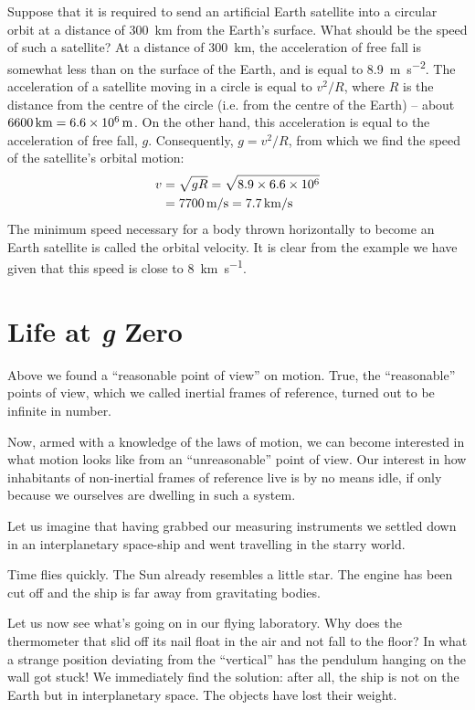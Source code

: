 Suppose that it is required to send an artificial Earth
satellite into a circular orbit at a distance of \SI{300}{\kilo\meter} from the Earth's surface. What should be the speed of such a
satellite? At a distance of \SI{300}{\kilo\meter}, the acceleration of
free fall is somewhat less than on the surface of the Earth,
and is equal to \SI{8.9}{\meter\per\second\squared}. The acceleration of a satellite moving in a circle is equal to $v^{2}/R$, where $R$ is the distance from the centre of the circle (i.e. from the centre of the
Earth) -- about $\SI{6600}{\kilo\meter} = \SI{6.6d6}{\meter}$. On the other hand, this acceleration is equal to the acceleration of free
fall, $g$. Consequently, $g = v^{2}/R$, from which we find
the speed of the satellite's orbital motion:
\begin{align*}
v & = \sqrt{gR} = \sqrt{8.9 \times \num{6.6d6}} \\
& = \SI{7700}{\meter\per\second} = \SI{7.7}{\kilo\meter\per\second}
\end{align*}
The minimum speed necessary for a body thrown horizontally to become an Earth satellite is called the orbital velocity. It is clear from the example we have given that this speed is close to \SI{8}{\kilo\meter\per\second}.


\section{Life at \emph{g} Zero}

Above we found a ``reasonable point of view'' on motion.
True, the ``reasonable'' points of view, which we called
inertial frames of reference, turned out to be infinite in
number.

Now, armed with a knowledge of the laws of motion,
we can become interested in what motion looks like
from an ``unreasonable'' point of view. Our interest in
how inhabitants of non-inertial frames of reference live
is by no means idle, if only because we ourselves are
dwelling in such a system.

Let us imagine that having grabbed our measuring
instruments we settled down in an interplanetary space-ship and went travelling in the starry world.

Time flies quickly. The Sun already resembles a little
star. The engine has been cut off and the ship is far away
from gravitating bodies.

Let us now see what's going on in our flying laboratory.
Why does the thermometer that slid off its nail float in
the air and not fall to the floor? In what a strange position
deviating from the ``vertical'' has the pendulum hanging
on the wall got stuck! We immediately find the solution:
after all, the ship is not on the Earth but in interplanetary
space. The objects have lost their weight.


